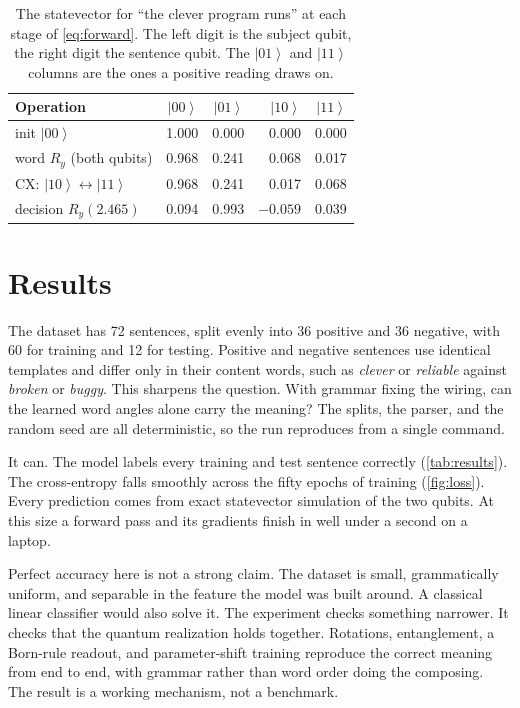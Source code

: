 \documentclass{article}
\newcommand{\ket}[1]{\left|#1\right\rangle}
\begin{document}
\begin{table}[t]
  \caption{The statevector for ``the clever program runs'' at each stage of
  \cref{eq:forward}. The left digit is the subject qubit, the right digit the
  sentence qubit. The $\ket{01}$ and $\ket{11}$ columns are the ones a positive
  reading draws on.}
  \label{tab:evolution}
  \vskip 0.1in
  \centering
  \small
  \setlength{\tabcolsep}{4pt}
  \begin{tabular}{lrrrr}
    \toprule
    Operation & $\ket{00}$ & $\ket{01}$ & $\ket{10}$ & $\ket{11}$ \\
    \midrule
    init $\ket{00}$            & 1.000 & 0.000 & 0.000 & 0.000 \\
    word $R_y$ (both qubits)   & 0.968 & 0.241 & 0.068 & 0.017 \\
    CX: $\ket{10}\!\leftrightarrow\!\ket{11}$ & 0.968 & 0.241 & 0.017 & 0.068 \\
    decision $R_y(2.465)$      & 0.094 & 0.993 & $-0.059$ & 0.039 \\
    \bottomrule
  \end{tabular}
  \vskip -0.1in
\end{table}

\section{Results}
\label{sec:experiments}

The dataset has 72 sentences, split evenly into 36 positive and 36 negative, with
60 for training and 12 for testing. Positive and negative sentences use identical
templates and differ only in their content words, such as \emph{clever} or
\emph{reliable} against \emph{broken} or \emph{buggy}. This sharpens the
question. With grammar fixing the wiring, can the learned word angles alone carry
the meaning? The splits, the parser, and the random seed are all deterministic,
so the run reproduces from a single command.

It can. The model labels every training and test sentence correctly
(\cref{tab:results}). The cross-entropy falls smoothly across the fifty epochs of
training (\cref{fig:loss}). Every prediction comes from exact statevector
simulation of the two qubits. At this size a forward pass and its gradients
finish in well under a second on a laptop.

Perfect accuracy here is not a strong claim. The dataset is small, grammatically
uniform, and separable in the feature the model was built around. A classical
linear classifier would also solve it. The experiment checks something narrower.
It checks that the quantum realization holds together. Rotations, entanglement, a
Born-rule readout, and parameter-shift training reproduce the correct meaning
from end to end, with grammar rather than word order doing the composing. The
result is a working mechanism, not a benchmark.
\end{document}
